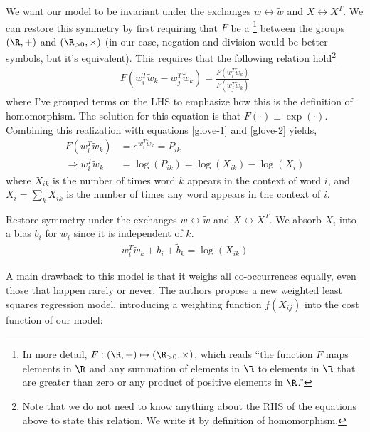 \documentclass[11pt]{article}
\begin{document}
\begin{compactenum}
	\item We want our model to be invariant under the exchanges $w \leftrightarrow \widetilde w$ and $X \leftrightarrow X^T$. We can restore this symmetry by first requiring that $F$ be a \footnote{In more detail, $F: (\R, +) \mapsto (\R_{>0}, \times)$, which reads ``the function $F$ maps elements in $\R$ and any summation of elements in $\R$ to elements in $\R$ that are greater than zero or any product of positive elements in $\R$.''	
	} between the groups $(\R, +)$ and $(\R_{>0}, \times)$ (in our case, negation and division would be better symbols, but it's equivalent). This requires that the following relation hold\footnote{Note that we do not need to know anything about the RHS of the equations above to state this relation. We write it by definition of homomorphism.}
	\begin{align}
		F(w_i^T \widetilde w_k - w_j^T \widetilde w_k) 
		=
		\frac{F(w_i^T \widetilde w_k)}{F(w_j^T \widetilde w_k)} \label{glove-2}
	\end{align}
	where I've grouped terms on the LHS to emphasize how this is the definition of homomorphism. The solution for this equation is that $F(\cdot) \equiv \exp(\cdot)$. Combining this realization with equations \ref{glove-1} and \ref{glove-2} yields,
	\begin{align}
		F(w_i^T\widetilde w_k) &= e^{w_i^T\widetilde w_k} = P_{ik} \\
		\Rightarrow w_i^T\widetilde w_k &= \log(P_{ik}) = \log(X_{ik}) - \log(X_i)
	\end{align}
	where $X_{ik}$ is the number of times word $k$ appears in the context of word $i$, and $X_i = \sum_k X_{ik}$ is the number of times any word appears in the context of $i$. 
	
	\item Restore symmetry under the exchanges $w \leftrightarrow \widetilde w$ and $X \leftrightarrow X^T$. We absorb $X_i$ into a bias $b_i$ for $w_i$ since it is independent of $k$. 
	\begin{align}
		w_i^T \widetilde w_k + b_i + \widetilde b_k = \log(X_{ik})
	\end{align}
	
	\item A main drawback to this model is that it weighs all co-occurrences equally, even
	those that happen rarely or never. The authors propose a new weighted least squares regression model, introducing a weighting function $f(X_{ij})$ into the cost function of our model:
\end{compactenum}
\end{document}
